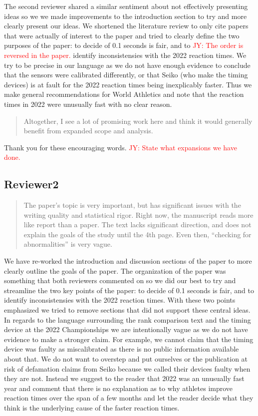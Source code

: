 \documentclass[12pt]{article}
\newcommand{\jy}[1]{\textcolor{red}{JY: #1}}
\newenvironment{comment}%
{\begin{quotation}\noindent\small\it\color{darkblue}\ignorespaces%
}{\end{quotation}}
\begin{document}
The second reviewer shared a similar sentiment about not effectively
presenting ideas so we we made improvements to the introduction section to try
and more clearly present our ideas.  We shortened the literature review to only
cite papers that were actually of interest to the paper and tried to clearly
define the two purposes of the paper: to decide of 0.1 seconds is fair, and to
\jy{The order is reversed in the paper.}
identify inconsistensies with the 2022 reaction times. We try to be precise in
our language as we do not have enough evidence to conclude that the sensors were
calibrated differently, or that Seiko (who make the timing devices) is at fault
for the 2022 reaction times being inexplicably faster. Thus we make general
recommendations for World Athletics and note that the reaction times in 2022
were unusually fast with no clear reason.

\begin{comment}
Altogether, I see a lot of promising work here and think it would generally
benefit from expanded scope and analysis.
\end{comment}


Thank you for these encouraging words. \jy{State what expansions we
  have done.}

\subsection*{Reviewer2}


\begin{comment}
The paper’s topic is very important, but has significant issues with the writing
quality and statistical rigor. Right now, the manuscript reads more like report
than a paper. The text lacks significant direction, and does not explain the
goals of the study until the 4th page. Even then, “checking for abnormalities”
is very vague.
\end{comment}


We have re-worked the introduction and discussion sections of the paper to more
clearly outline the goals of the paper.  The organization of the paper was
something that both reviewers commented on so we did our best to try and
streamline the two key points of the paper: to decide of 0.1 seconds is fair,
and to identify inconsistensies with the 2022 reaction times. With these two
points emphasized we tried to remove sections that did not support these central
ideas.  In regards to the language surrounding the rank comparison text and the
timing device at the 2022 Championships we are intentionally vague as we do not
have evidence to make a stronger claim.  For example, we cannot claim that the
timing device was faulty as miscalibrated as there is no public information
available about that.  We do not want to overstep and put ourselves or the
publication at risk of defamation claims from Seiko because we called their
devices faulty when they are not.  Instead we suggest to the reader that 2022
was an unusually fast year and comment that there is no explanation as to why
athletes improve reaction times over the span of a few months and let the reader
decide what they think is the underlying cause of the faster reaction times.
\end{document}
